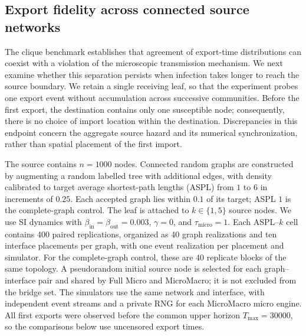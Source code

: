 \documentclass[a4paper,fleqn]{cas-sc}
\begin{document}
\subsection{Export fidelity across connected source networks}
\label{sec:random_source_export}

The clique benchmark establishes that agreement of export-time distributions can coexist with a violation of the microscopic transmission mechanism. We next examine whether this separation persists when infection takes longer to reach the source boundary. We retain a single receiving leaf, so that the experiment probes one export event without accumulation across successive communities. Before the first export, the destination contains only one susceptible node; consequently, there is no choice of import location within the destination. Discrepancies in this endpoint concern the aggregate source hazard and its numerical synchronization, rather than spatial placement of the first import.

The source contains $n=1000$ nodes. Connected random graphs are constructed by augmenting a random labelled tree with additional edges, with density calibrated to target average shortest-path lengths (ASPL) from $1$ to $6$ in increments of $0.25$. Each accepted graph lies within $0.1$ of its target; ASPL $1$ is the complete-graph control. The leaf is attached to $k\in\{1,5\}$ source nodes. We use SI dynamics with $\beta_{\mathrm{in}}=\beta_{\mathrm{out}}=0.003$, $\gamma=0$, and $\tau_{\mathrm{micro}}=1$. Each ASPL--$k$ cell contains 400 paired replications, organized as 40 graph realizations and ten interface placements per graph, with one event realization per placement and simulator. For the complete-graph control, these are 40 replicate blocks of the same topology. A pseudorandom initial source node is selected for each graph--interface pair and shared by Full Micro and MicroMacro; it is not excluded from the bridge set. The simulators use the same network and interface, with independent event streams and a private RNG for each MicroMacro micro engine. All first exports were observed before the common upper horizon $T_{\max}=30000$, so the comparisons below use uncensored export times.
\end{document}
